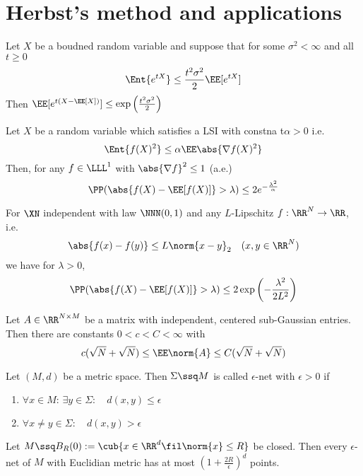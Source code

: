 \section{Herbst's method and applications}


\begin{thm}
    Let $X$ be a boudned random variable and suppose that for some $\sigma^2 < \infty$ and all $t\geq 0$
    $$\Ent{e^{tX}} \leq \frac{t^2 \sigma^2}{2} \EE[e^{tX}]$$
    Then $\EE[e^{t(X-\EE[X])}]\leq \exp\left(\frac{t^2 \sigma^2}{2}\right)$
\end{thm}


\begin{thm}
    Let $X$ be a random variable which satisfies a LSI with constna t$\alpha >0$ i.e.
    $$\Ent{f(X)^2} \leq \alpha \EE \abs{\nabla f(X)^2}$$
    Then, for any $f\in \LLL^1$ with $\abs{\nabla f}^2\leq 1$ (a.e.)
    $$\PP(\abs{f(X)-\EE[f(X)]}>\lambda) \leq 2 e^{-\frac{\lambda^2}{\alpha}}$$
\end{thm}


\begin{thm}
    For $\XN$ independent with law $\NNN(0,1)$ and any $L$-Lipschitz $f:\RR^N \to \RR$, i.e. 
    $$\abs{f(x)-f(y)} \leq L \norm{x-y}_2 \quad (x,y \in \RR^N)$$
    we have for $\lambda>0$, 
    $$\PP(\abs{f(X)-\EE[f(X)]}> \lambda) \leq 2 \exp\left(- \frac{\lambda^2}{2L^2}\right)$$
\end{thm}


\begin{thm}
    Let $A \in \RR^{N \times M}$ be a matrix with independent, centered sub-Gaussian entries. Then there are constants $0<c<C<\infty$ with 
    $$c(\sqrt{N}+\sqrt{N}) \leq \EE \norm{A}\leq C(\sqrt{N}+\sqrt{N})$$
\end{thm}


\begin{defn}
    Let $(M,d)$ be a metric space. Then $\Sigma\ssq M$ is called $\epsilon$-net with $\epsilon>0$ if
    \begin{enumerate}
        \item $\forall x \in M: \, \exists y \in \Sigma: \quad d(x,y) \leq \epsilon$
        \item $\forall x\neq y \in \Sigma:\quad  d(x,y) > \epsilon$
    \end{enumerate}
\end{defn}


\begin{thm}
    Let $M \ssq B_R(0):= \cub{x\in \RR^d \fil \norm{x} \leq R}$ be closed. Then every $\epsilon$-net of $M$ with Euclidian metric has at most $(1+\frac{2R}{\epsilon})^d$ points.
\end{thm}


